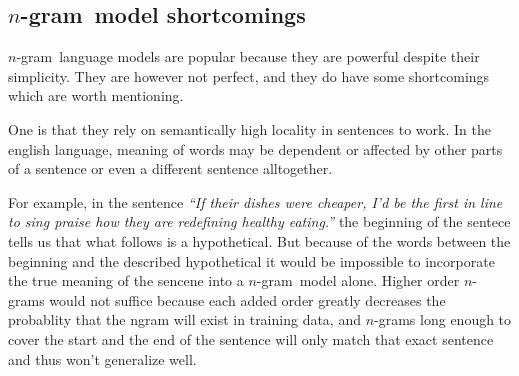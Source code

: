 \documentclass[a4paper,11pt]{kth-mag}
\newcommand{\ngram}{$n$-gram}
\begin{document}



\subsection{\ngram~model shortcomings}
\ngram~language models are popular because they are powerful despite their simplicity. They are however not
perfect, and they do have some shortcomings which are worth mentioning.

One is that they rely on semantically high locality in sentences to work. In the english language, meaning of words
may be dependent or affected by other parts of a sentence or even a different sentence alltogether.

For example, in the sentence \emph{``If their dishes were cheaper, I'd be the first in line to sing praise how they are redefining healthy eating.''} the beginning of the sentece tells us that what follows is a hypothetical. But because of the words between the beginning and the described hypothetical it would be impossible to incorporate the
true meaning of the sencene into a \ngram~model alone. Higher order \ngram s would not suffice because each added order greatly decreases the probablity that the ngram will exist in training data, and \ngram s long enough to cover the start and the end of the sentence will only match that exact sentence and thus won't generalize well.




\end{document}
